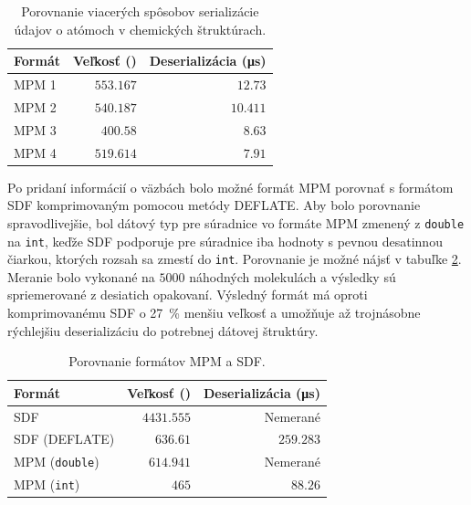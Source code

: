 \documentclass[slovak]{ExcelAtFIT} %
\begin{document}
\begin{table}[h]
	\vskip6pt
	\caption{Porovnanie viacerých spôsobov serializácie údajov o atómoch v chemických štruktúrach.}
	\centering
	\begin{tabular}{l|r|r}
		\toprule
		Formát & Veľkosť (\si{\byte}) & Deserializácia (\si{\micro\second}) \\
		\midrule
		MPM 1 & $553.167$ & $12.73$ \\
		MPM 2 & $540.187$ & $10.411$ \\
		MPM 3 & $400.58$ & $8.63$ \\
		MPM 4 & $519.614$ & $7.91$ \\
		\bottomrule
	\end{tabular}
	\label{tab:mpms}
\end{table}

Po pridaní informácií o väzbách bolo možné formát MPM porovnať s formátom SDF komprimovaným pomocou metódy DEFLATE. Aby bolo porovnanie spravodlivejšie, bol dátový typ pre súradnice vo formáte MPM zmenený z \texttt{double} na \texttt{int}, keďže SDF podporuje pre súradnice iba hodnoty s pevnou desatinnou čiarkou, ktorých rozsah sa zmestí do \texttt{int}. Porovnanie je možné nájsť v tabuľke \ref{tab:sdfvsmpm}. Meranie bolo vykonané na $5000$ náhodných molekulách a výsledky sú spriemerované z desiatich opakovaní. Výsledný formát má oproti komprimovanému SDF o \SI{27}{\percent} menšiu veľkosť a umožňuje až trojnásobne rýchlejšiu deserializáciu do potrebnej dátovej štruktúry.

\begin{table}[h]
	\vskip6pt
	\caption{Porovnanie formátov MPM a SDF.}
	\centering
	\begin{tabular}{l|r|r}
		\toprule
		Formát & Veľkosť (\si{\byte}) & Deserializácia (\si{\micro\second}) \\
		\midrule
		SDF & $4431.555$ & Nemerané \\
		SDF (DEFLATE) & $636.61$ & $259.283$ \\
		MPM (\texttt{double}) & $614.941$ & Nemerané \\
		MPM (\texttt{int}) & $465$ & $88.26$ \\
		\bottomrule
	\end{tabular}
	\label{tab:sdfvsmpm}
\end{table}
\end{document}
